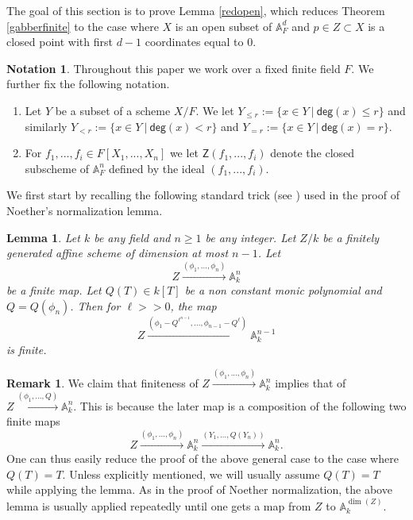 \documentclass[10pt]{amsart}
\theoremstyle{plain}
\newtheorem{lemma}[thm]{Lemma}
\theoremstyle{definition}
\newtheorem{remark}[thm]{Remark}
\newtheorem{notation}[thm]{Notation}
\newcommand{\A}{{\mathbb A}}
\let\syn\mathsf
\newcommand{\scr}{\scriptscriptstyle}
\newcommand{\dg}{\syn{deg}}
\begin{document}
The goal of this section is to prove Lemma \ref{redopen}, which reduces Theorem \ref{gabberfinite} to the case where $X$ is an open subset of $\A^d_F$ and $p\in Z\subset X$ is a closed point with first $d-1$ coordinates equal to $0$. 


\begin{notation}\label{notation} Throughout this paper we work over a fixed finite field $F$. We further fix the following notation. 
\begin{enumerate}
\item Let $Y$ be a subset of a scheme $X/F$. We let $Y_{ \scr \leq r}:= \{x\in Y\ |\ \dg(x) \leq r\}$ and similarly $Y_{ \scr < r}:= \{x\in Y\ |\ \dg(x) < r\}$ and $Y_{ \scr = r}:= \{x\in Y\ |\ \dg(x) = r\}$.  
\item For $f_1,...,f_i\in F[X_1,...,X_n]$ we let $\syn{Z}(f_1,...,f_i)$ denote the closed subscheme of $\A^n_F$ defined by the ideal  $(f_1,...,f_i)$. 
\end{enumerate}
\end{notation}


We first start by recalling the following standard trick (see \cite{mum}) used in the proof of Noether's normalization lemma. 

\begin{lemma}\cite[page 2]{mum}\label{nntrick1}
 Let $k$ be any field and $n\geq 1$ be any integer. Let $Z/k$ be a finitely generated affine scheme of dimension at most  $n-1$.  Let $$Z\xrightarrow{(\phi_1,...,\phi_n)}\A^{n}_k$$ be a finite map. Let  $Q (T)\in k[T]$ be a non constant monic polynomial and $Q=Q(\phi_n)$. Then for $\ell>>0$, the map 
$$ Z\xrightarrow{(\phi_{\scr 1}-Q^{\ell^{n-1}},\ldots,\phi_{\scr n-1}-Q^{\ell})} \A^{n-1}_k$$ is finite.
\end{lemma}

\begin{remark}\label{q=phin}
We claim that finiteness of $Z\xrightarrow{(\phi_1,...,\phi_n)}\A^{n}_k$ implies that of $ Z \xrightarrow{(\phi_1,...,Q)}\A^{n}_k$. This is because the later map is a composition of the following two finite maps
 $$Z\xrightarrow{(\phi_1,...,\phi_n)}\A^{n}_k \xrightarrow{(Y_1,\ldots ,Q(Y_n))}\A^{n}_k.$$
 One can thus easily reduce the proof of the above general case to the case where $Q(T)=T$.  Unless explicitly mentioned, we will usually assume $Q(T)=T$ while applying the lemma. As in the proof of Noether normalization, the above lemma is usually applied repeatedly until one gets a map from $Z$ to $\A^{\dim(Z)}_k$. 
\end{remark}
\end{document}
